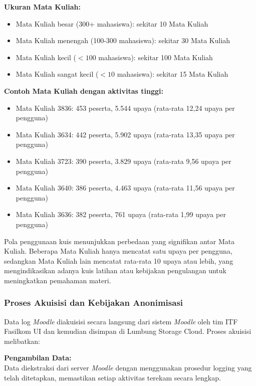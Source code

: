 \textbf{Ukuran Mata Kuliah:}
\begin{itemize}
    \item Mata Kuliah besar (300+ mahasiswa): sekitar 10 Mata Kuliah
    \item Mata Kuliah menengah (100-300 mahasiswa): sekitar 30 Mata Kuliah
    \item Mata Kuliah kecil ($<100$ mahasiswa): sekitar 100 Mata Kuliah
    \item Mata Kuliah sangat kecil ($<10$ mahasiswa): sekitar 15 Mata Kuliah
\end{itemize}

\textbf{Contoh Mata Kuliah dengan aktivitas tinggi:}
\begin{itemize}
    \item Mata Kuliah 3836: 453 peserta, 5.544 upaya (rata-rata 12,24 upaya per pengguna)
    \item Mata Kuliah 3634: 442 peserta, 5.902 upaya (rata-rata 13,35 upaya per pengguna)
    \item Mata Kuliah 3723: 390 peserta, 3.829 upaya (rata-rata 9,56 upaya per pengguna)
    \item Mata Kuliah 3640: 386 peserta, 4.463 upaya (rata-rata 11,56 upaya per pengguna)
    \item Mata Kuliah 3636: 382 peserta, 761 upaya (rata-rata 1,99 upaya per pengguna)
\end{itemize}

Pola penggunaan kuis menunjukkan perbedaan yang signifikan antar Mata Kuliah. Beberapa Mata Kuliah hanya mencatat satu upaya per pengguna, sedangkan Mata Kuliah lain mencatat rata-rata 10 upaya atau lebih, yang mengindikasikan adanya kuis latihan atau kebijakan pengulangan untuk meningkatkan pemahaman materi.

\subsubsection{Proses Akuisisi dan Kebijakan Anonimisasi}
\label{sec:prosesAkuisisiKebijakanAnonimisasi}
Data log \textit{Moodle} diakuisisi secara langsung dari sistem \textit{Moodle} oleh tim ITF Fasilkom UI dan kemudian disimpan di Lumbung Storage Cloud. Proses akuisisi melibatkan:

\textbf{Pengambilan Data:} \\
Data diekstraksi dari server \textit{Moodle} dengan menggunakan prosedur logging yang telah ditetapkan, memastikan setiap aktivitas terekam secara lengkap.


